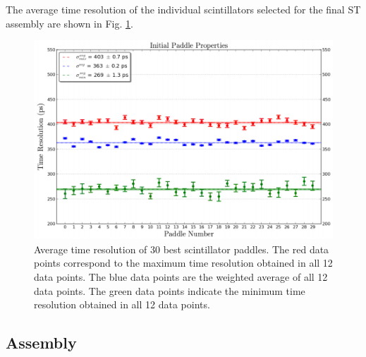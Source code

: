 The average time resolution of the individual scintillators selected for the final ST assembly are shown in Fig. \ref{fig:final_30_tr_wrapped}.
	\begin{figure}[!htb]
		\centering
		\includegraphics[width=1.0\columnwidth]{fabrication//figs/final_30_tr_wrapped}
		\caption{Average time resolution of 30 best scintillator paddles.  The red data points correspond to the maximum time resolution obtained in all 12 data points. The blue data points are the weighted average of all 12 data points.  The green data points indicate the minimum time resolution obtained in all 12 data points.}
		\label{fig:final_30_tr_wrapped}
	\end{figure}

\subsection{Assembly}

